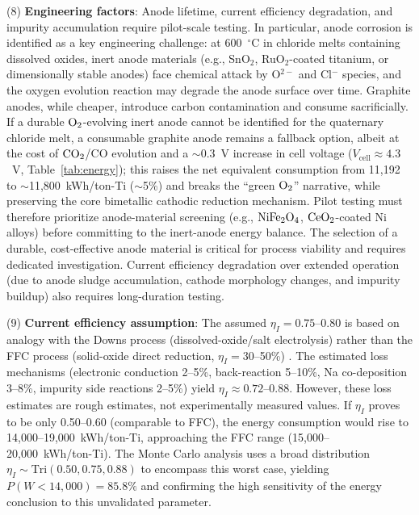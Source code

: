 \documentclass[sn-mathphys,Numbered]{sn-jnl}
\begin{document}
(8) \textbf{Engineering factors}: Anode lifetime, current efficiency degradation, and impurity accumulation require pilot-scale testing. In particular, anode corrosion is identified as a key engineering challenge: at 600~$^{\circ}$C in chloride melts containing dissolved oxides, inert anode materials (e.g., SnO$_2$, RuO$_2$-coated titanium, or dimensionally stable anodes) face chemical attack by O$^{2-}$ and Cl$^-$ species, and the oxygen evolution reaction may degrade the anode surface over time. Graphite anodes, while cheaper, introduce carbon contamination and consume sacrificially. If a durable $\ce{O2}$-evolving inert anode cannot be identified for the quaternary chloride melt, a consumable graphite anode remains a fallback option, albeit at the cost of $\ce{CO2}$/CO evolution and a $\sim$0.3~V increase in cell voltage ($V_{\mathrm{cell}} \approx 4.3$~V, Table~\ref{tab:energy}); this raises the net equivalent consumption from 11{,}192 to $\sim$11{,}800~kWh/ton-Ti ($\sim$5\%) and breaks the ``green $\ce{O2}$'' narrative, while preserving the core bimetallic cathodic reduction mechanism. Pilot testing must therefore prioritize anode-material screening (e.g., $\ce{NiFe2O4}$, $\ce{CeO2}$-coated Ni alloys) before committing to the inert-anode energy balance. The selection of a durable, cost-effective anode material is critical for process viability and requires dedicated investigation. Current efficiency degradation over extended operation (due to anode sludge accumulation, cathode morphology changes, and impurity buildup) also requires long-duration testing.

(9) \textbf{Current efficiency assumption}: The assumed $\eta_I = 0.75$--0.80 is based on analogy with the Downs process (dissolved-oxide/salt electrolysis) \cite{plettcher1990,ji2026} rather than the FFC process (solid-oxide direct reduction, $\eta_I = 30$--50\%) \cite{fray2000}. The estimated loss mechanisms (electronic conduction 2--5\%, back-reaction 5--10\%, Na co-deposition 3--8\%, impurity side reactions 2--5\%) yield $\eta_I \approx 0.72$--0.88. However, these loss estimates are rough estimates, not experimentally measured values. If $\eta_I$ proves to be only 0.50--0.60 (comparable to FFC), the energy consumption would rise to 14{,}000--19{,}000~kWh/ton-Ti, approaching the FFC range (15{,}000--20{,}000~kWh/ton-Ti). The Monte Carlo analysis uses a broad distribution $\eta_I \sim \mathrm{Tri}(0.50, 0.75, 0.88)$ to encompass this worst case, yielding $P(W < 14{,}000) = 85.8\%$ and confirming the high sensitivity of the energy conclusion to this unvalidated parameter.
\end{document}
